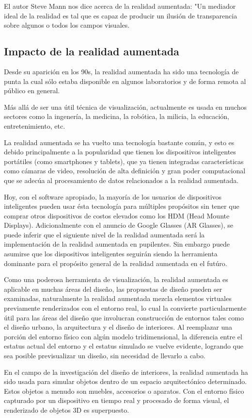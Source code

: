 El autor Steve Mann nos dice acerca de la realidad aumentada: "Un mediador ideal de la realidad es tal que es capaz de producir un ilusión de transparencia sobre algunos o todos los campos visuales.\cite{B22} \par
\subsection{Impacto de la realidad aumentada}
Desde su aparición en los 90s, la realidad aumentada ha sido una tecnología de punta la cual sólo estaba disponible en algunos laboratorios y de forma remota al público en general. \par
Más allá de ser una útil técnica de visualización, actualmente es usada en muchos sectores como la ingenería, la medicina, la robótica, la milicia, la educación, entretenimiento, etc.\par
La realidad aumentada se ha vuelto una tecnología bastante común, y esto es debido principalmente a la popularidad que tienen los dispositivos inteligentes portátiles (como smartphones y tablets), que ya tienen integradas características como cámaras de video, resolución de alta definición y gran poder computacional que se adecúa al procesamiento de datos relacionados a la realidad aumentada.\par
Hoy, con el software apropiado, la mayoría de los usuarios de dispositivos inteligentes pueden usar ésta tecnología para múltiples propósitos sin tener que comprar otros dispositivos de costos elevados como los HDM (Head Mounte Displays). Adicionalmente con el anuncio de Google Glasses (AR Glasses), se puede inferir que el siguiente nivel de la realidad aumentada será la implementación de la realidad aumentada en pupilentes. Sin embargo puede asumirse que los dispositivos inteligentes seguirán siendo la herramienta dominante para el propósito general de la realidad aumentada en el futúro.\par
Como una poderosa herramienta de visualización, la realidad aumentada es aplicable en muchas áreas del diseño, las propuestas de diseño pueden ser examinadas, naturalmente la realidad aumentada mezcla elementos virtuales previamente renderizados con el entorno real, lo cual la convierte particularmente útil para las áreas del diseño que involucran construcción de entornos tales como el diseño urbano, la arquitectura y el diseño de interiores. Al reemplazar una porción del entorno físico con algún modelo tridimensional, la diferencia entre el estatus actual del entorno y el estatus simulado se vuelve evidente, logrando que sea posible previsualizar un diseño, sin necesidad de llevarlo a cabo.\par
En el campo de la investigación del diseño de interiores, la realidad aumentada ha sido usada para simular objetos dentro de un espacio arquitectónico determinado. Estos objetos a menudo son muebles, accesorios o aparatos. Con el entorno físico capturado por un dispositivo en tiempo real y procesado de forma visual, el renderizado de objetos 3D es superpuesto.\cite{B15}

